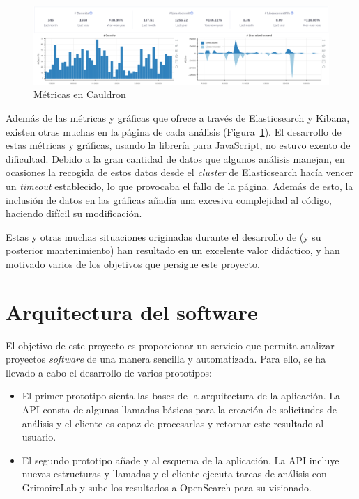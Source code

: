 \begin{figure}[ht]
    \centering
    \includegraphics[width=\textwidth]{Figures/cauldron-metrics-charts}
    \decoRule
    \caption[Cauldron (Métricas)]{Métricas en Cauldron}
    \label{fig:cauldron-metrics-charts}
\end{figure}

Además de las métricas y gráficas que  ofrece a través de Elasticsearch y Kibana, existen otras muchas en la página de cada análisis (Figura~\ref{fig:cauldron-metrics-charts}). El desarrollo de estas métricas y gráficas, usando la librería  para JavaScript, no estuvo exento de dificultad. Debido a la gran cantidad de datos que algunos análisis manejan, en ocasiones la recogida de estos datos desde el \emph{cluster} de Elasticsearch hacía vencer un \emph{timeout} establecido, lo que provocaba el fallo de la página. Además de esto, la inclusión de datos en las gráficas añadía una excesiva complejidad al código, haciendo difícil su modificación.

Estas y otras muchas situaciones originadas durante el desarrollo de  (y su posterior mantenimiento) han resultado en un excelente valor didáctico, y han motivado varios de los objetivos que persigue este proyecto.


\section{Arquitectura del software}

El objetivo de este proyecto es proporcionar un servicio que permita analizar proyectos \emph{software} de una manera sencilla y automatizada. Para ello, se ha llevado a cabo el desarrollo de varios prototipos:

\begin{itemize}
    \item El primer prototipo sienta las bases de la arquitectura de la aplicación. La API consta de algunas llamadas básicas para la creación de solicitudes de análisis y el cliente es capaz de procesarlas y retornar este resultado al usuario.
    \item El segundo prototipo añade  y  al esquema de la aplicación. La API incluye nuevas estructuras y llamadas y el cliente ejecuta tareas de análisis con GrimoireLab y sube los resultados a OpenSearch para su visionado.
\end{itemize}

